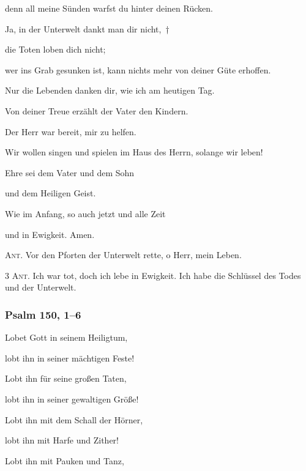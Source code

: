 denn all meine Sünden warfst du hinter deinen Rücken.

\noindent Ja, in der Unterwelt dankt man dir nicht,~†~\nopagebreak

die Toten loben dich nicht;~\GreStar{}~\nopagebreak

wer ins Grab gesunken ist, kann nichts mehr von deiner Güte erhoffen.

\noindent Nur die Lebenden danken dir, wie ich am heutigen Tag.~\GreStar{}~\nopagebreak

Von deiner Treue erzählt der Vater den Kindern.

\noindent Der Herr war bereit, mir zu helfen.~\GreStar{}~\nopagebreak

Wir wollen singen und spielen im Haus des Herrn, solange wir leben!

\noindent Ehre sei dem Vater und dem Sohn~\GreStar{}~\nopagebreak

und dem Heiligen Geist.

\noindent Wie im Anfang, so auch jetzt und alle Zeit~\GreStar{}~\nopagebreak

und in Ewigkeit. Amen.

\vspace{10pt}

\noindent \textsc{Ant.} Vor den Pforten der Unterwelt rette, o Herr, mein Leben.


\newpage

\noindent \textsc{3 Ant.} Ich war tot, doch ich lebe in Ewigkeit. Ich habe die Schlüssel des Todes und der Unterwelt.

\subsubsection{Psalm 150, 1--6}

\noindent Lobet Gott in seinem Heiligtum,~\GreStar{}~\nopagebreak

lobt ihn in seiner mächtigen Feste!

\noindent Lobt ihn für seine großen Taten,~\GreStar{}~\nopagebreak

lobt ihn in seiner gewaltigen Größe!

\noindent Lobt ihn mit dem Schall der Hörner,~\GreStar{}~\nopagebreak

lobt ihn mit Harfe und Zither!

\noindent Lobt ihn mit Pauken und Tanz,~\GreStar{}~\nopagebreak

